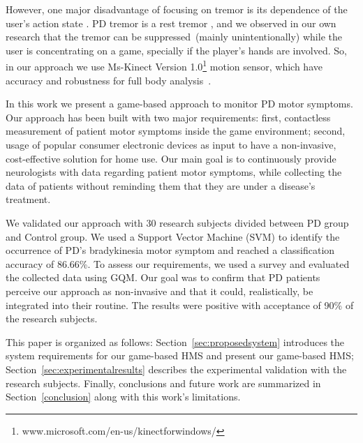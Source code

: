 \documentclass[10pt, conference, compsocconf]{IEEEtran}
\begin{document}
However, one major disadvantage of focusing on tremor is its dependence of the user's action state \cite{synnott_wiipd_2012}. PD tremor is a rest tremor \cite{national2006parkinson}, and we observed in our own research that the tremor can be suppressed~(mainly unintentionally) while the user is concentrating on a game, specially if the player's hands are involved. So, in our approach we use Ms-Kinect Version 1.0\footnote{www.microsoft.com/en-us/kinectforwindows/} motion sensor, which have accuracy and robustness for full body analysis~\cite{gabel2012}.

In this work we present a game-based approach to monitor PD motor symptoms. Our approach has been built with two major requirements: first, contactless measurement of patient motor symptoms inside the game environment; second, usage of popular consumer electronic devices as input to have a non-invasive, cost-effective solution for home use. Our main goal is to continuously provide neurologists with data regarding patient motor symptoms, while collecting the data of patients without reminding them that they are under a disease's treatment.

We validated our approach with 30 research subjects divided between PD group and Control group. We used a Support Vector Machine (SVM) to identify the occurrence of PD's bradykinesia motor symptom and reached a classification accuracy of 86.66\%. To assess our requirements, we used a survey and evaluated the collected data using GQM. Our goal was to confirm that PD patients perceive our approach as non-invasive and that it could, realistically, be integrated into their routine. The results were positive with acceptance of 90\% of the research subjects. 

This paper is organized as follows: Section~\ref{sec:proposedsystem} introduces the system requirements for our game-based HMS and present our game-based HMS; Section~\ref{sec:experimentalresults} describes the experimental validation with the research subjects. Finally, conclusions and future work are summarized in Section~\ref{conclusion} along with this work's limitations.

\end{document}
